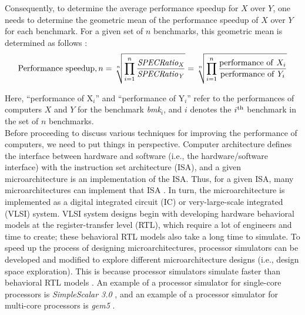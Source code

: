 Consequently, to determine the average performance speedup for $X$ over $Y$, one needs to determine the geometric mean of the performance speedup of $X$ over $Y$ for each benchmark. For a given set of $n$ benchmarks, this geometric mean is determined as follows \cite{Hennessy2012}:
\begin{equation}
\label{eqn:GeometricMeanofSPECRatioXY}
{\rm Performance\ speedup}, n = \sqrt[n]{\displaystyle\prod^{n}_{i = 1} \frac{\it SPECRatio_{X}}{\it SPECRatio_{Y}}} = \sqrt[n]{\displaystyle\prod^{n}_{i = 1} \frac{{\rm performance\ of\ }X_{i}}{{\rm performance\ of\ }Y_{i}}}
\end{equation}

Here, ``performance of X$_{i}$'' and ``performance of Y$_{i}$'' refer to the performances of computers $X$ and $Y$ for the benchmark {\it bmk}$_{i}$, and $i$ denotes the $i^{\rm th}$ benchmark in the set of $n$ benchmarks. \\

Before proceeding to discuss various techniques for improving the performance of computers, we need to put things in perspective. Computer architecture defines the interface between hardware and software (i.e., the hardware/software interface) with the instruction set architecture (ISA), and a given microarchitecture is an implementation of the ISA. Thus, for a given ISA, many microarchitectures can implement that ISA \cite{Hennessy2012,Shen2005a}. In turn, the microarchitecture is implemented as a digital integrated circuit (IC) or very-large-scale integrated (VLSI) system. VLSI system designs begin with developing hardware behavioral models at the register-transfer level (RTL), which require a lot of engineers and time to create; these behavioral RTL models also take a long time to simulate. To speed up the process of designing microarchitectures, processor simulators can be developed and modified to explore different microarchitecture designs (i.e., design space exploration). This is because processor simulators simulate faster than behavioral RTL models \cite{Vachharajani2004,Monchiero2008,Bailey2010a,Bailey2007,Kempf2011,Leupers2010,Shen2005a}. An example of a processor simulator for single-core processors is {\it SimpleScalar 3.0} \cite{SimpleScalar2004}, and an example of a processor simulator for multi-core processors is {\it gem5} \cite{Binkert2011,gem5developers2014}. \\

